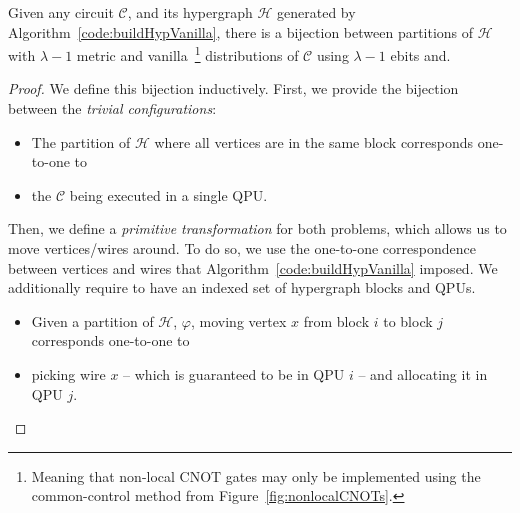 \begin{theorem} Given any circuit \(\mathcal{C}\), and its hypergraph \(\mathcal{H}\) generated by Algorithm~\ref{code:buildHypVanilla}, there is a bijection between partitions of \(\mathcal{H}\) with \(\lambda-1\) metric and vanilla~\footnote{Meaning that non-local CNOT gates may only be implemented using the common-control method from Figure~\ref{fig:nonlocalCNOTs}.} distributions of \(\mathcal{C}\) using \(\lambda\!-\!1\) ebits and.
\label{thm:vanilla}
\end{theorem} \begin{proof}
We define this bijection inductively. First, we provide the bijection between the \textit{trivial configurations}:
\begin{itemize}
  \item The partition of \(\mathcal{H}\) where all vertices are in the same block corresponds one-to-one to 
  \item the \(\mathcal{C}\) being executed in a single QPU.
\end{itemize}

Then, we define a \textit{primitive transformation} for both problems, which allows us to move vertices/wires around. To do so, we use the one-to-one correspondence between vertices and wires that Algorithm~\ref{code:buildHypVanilla} imposed. We additionally require to have an indexed set of hypergraph blocks and QPUs.
\begin{itemize}
  \item Given a partition of \(\mathcal{H}\), \(\varphi\), moving vertex \(x\) from block \(i\) to block \(j\) corresponds one-to-one to
  \item picking wire \(x\) -- which is guaranteed to be in QPU \(i\) -- and allocating it in QPU \(j\).
\end{itemize}


\end{proof}
